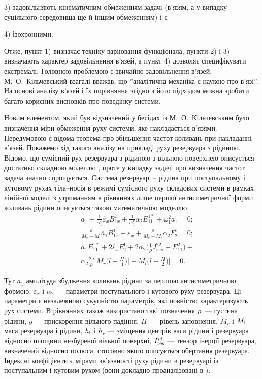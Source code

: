 \documentclass[11pt, reqno]{amsart}
\begin{document}
3) задовільняють кінематичним обмеженням задачі (в'язям, а у випадку суцільного середовища ще й іншим обмеженням) і є

4) ізохронними.

Отже, пункт 1) визначає техніку варіювання функціонала, пункти 2) і 3) визначають характер задовільнення в’язей, а пункт 4) дозволяє специфікувати екстремалі. Головною проблемою є звичайно задовільнення в’язей. М.~О.~Кільчевський взагалі вважав, що ''аналітична механіка є наукою про в’язі''.  На основі аналізу в’язей і їх порівняння згідно з його підходом можна зробити багато корисних висновків про поведінку системи.

Новим елементом, який був відзначений у бесідах із М.~О.~Кільчевським було визначення міри обмеження руху системи, яке накладається в'язями. Передумовою є відома теорема \cite{Gan} про збільшення частот коливань при накладанні в'язей. Покажемо хід такого аналізу на прикладі руху резервуара з рідиною. Відомо, що сумісний рух резервуара з рідиною з вільною поверхнею описується достатньо складною моделлю \cite{Limbo}, проте у випадку задачі про визначення частот задача значно спрощується.
Система резервуар~-- рідина при поступальному і кутовому рухах тіла--носія в режимі сумісного руху складових системи в рамках лінійної моделі з утриманням в рівняннях лише першої антисиметричної форми коливань рідини описується такою математичною моделлю.
\begin{eqnarray}\label{1}
   &&\ddot{a_1} +\frac{1}{\alpha_1^v} \ddot{\varepsilon_x} B^1_{1x} +\frac{1}{\alpha_1^v} \ddot{\alpha_2} E^{1*}_{11} +\omega_1^2 a_1 =0;\\
   &&\frac{\rho}{M_r+M_l} \ddot{a_1} B^1_{1x} +\ddot{\varepsilon_x} +\frac{\rho}{M_r+M_l}\ddot{\alpha_2}F_2^1 =0; \nonumber\\
   &&\ddot{a_1} E^{1*}_{11} + 2 \ddot{\varepsilon_x}  F_2^1 \!+ 2 \ddot{\alpha_2} \bigg (\frac{1}{\rho} J_{res}^{22}+E_{11}^2 \bigg )\!\!  +\nonumber\\
   &&\alpha_2 \frac{2g}{\rho} \bigg [ M_r \bigg (l+\frac{H}{4} \bigg) \bigg ]\!\! +M_l \bigg (l+\frac{H}{2} \bigg ) \bigg ]\! \! =0.\nonumber
\end{eqnarray}

Тут $a_1$ амплітуда збудження коливань рідини за першою антисиметричною формою, $\varepsilon_x$ і $\alpha_2$ --- параметри поступального і кутового руху резервуара. Ці параметри є незалежною сукупністю параметрів, які повністю характеризують рух системи. В рівняннях також використано такі позначення $\rho$~--- густина рідини, $g$ --- прискорення вільного падіння, $H$~---
рівень заповнення, $M_r$ і $M_{\rm l}$ --- маса резервуара і рідини, $h_{\rm l}$ і $h_r$ --- зміщення центрів ваги рідини і резервуара відносно площини незбуреної
вільної поверхні, $I_{\rm res}^{ij}$ --- тензор інерції резервуара, визначений відносно полюса, стосовно якого описується обертання резервуара. Індексні коефіцієнти є мірами зв'язаності руху рідини в резервуарі із поступальним і кутовим рухом (вони докладно проаналізовані в \cite{Limbo}).
\end{document}
